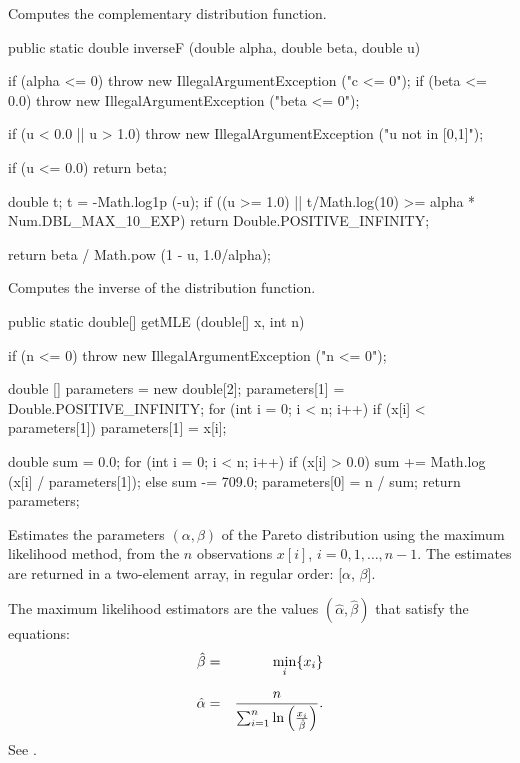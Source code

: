   \begin{tabb}
  Computes the complementary distribution function.
 \end{tabb}
\begin{code}

   public static double inverseF (double alpha, double beta, double u)\begin{hide} {
      if (alpha <= 0)
        throw new IllegalArgumentException ("c <= 0");
      if (beta <= 0.0)
        throw new IllegalArgumentException ("beta <= 0");

      if (u < 0.0 || u > 1.0)
         throw new IllegalArgumentException ("u not in [0,1]");

      if (u <= 0.0)
         return beta;

      double t;
      t = -Math.log1p (-u);
      if ((u >= 1.0) || t/Math.log(10) >= alpha * Num.DBL_MAX_10_EXP)
         return Double.POSITIVE_INFINITY;

      return beta / Math.pow (1 - u, 1.0/alpha);
   }\end{hide}
\end{code}
  \begin{tabb}
  Computes the inverse of the distribution function.
 \end{tabb}
\begin{code}

   public static double[] getMLE (double[] x, int n)\begin{hide} {
      if (n <= 0)
         throw new IllegalArgumentException ("n <= 0");

      double [] parameters = new double[2];
      parameters[1] = Double.POSITIVE_INFINITY;
      for (int i = 0; i < n; i++) {
         if (x[i] < parameters[1])
            parameters[1] = x[i];
      }

      double sum = 0.0;
      for (int i = 0; i < n; i++) {
         if (x[i] > 0.0)
            sum += Math.log (x[i] / parameters[1]);
         else
            sum -= 709.0;
      }
      parameters[0] = n / sum;
      return parameters;
   }\end{hide}
\end{code}
\begin{tabb}
   Estimates the parameters $(\alpha,\beta)$ of the Pareto distribution
   using the maximum likelihood method, from the $n$ observations
   $x[i]$, $i = 0, 1,\ldots, n-1$. The estimates are returned in a two-element
    array, in regular order: [$\alpha$, $\beta$].
   \begin{detailed}
   The maximum likelihood estimators are the values $(\hat\alpha, \hat\beta)$
   that satisfy the equations:
   \begin{eqnarray*}
      \hat{\beta} & = & \min_i \{x_i\}\\[7pt]
      \hat{\alpha} & = & \frac{n}{\sum_{i=1}^{n}
      \ln\left(\frac{x_i}{\hat{\beta}\rule{0pt}{0.5em}}\right)}.
   \end{eqnarray*}
   See \cite[page 581]{tJOH95a}.
   \end{detailed}
\end{tabb}
